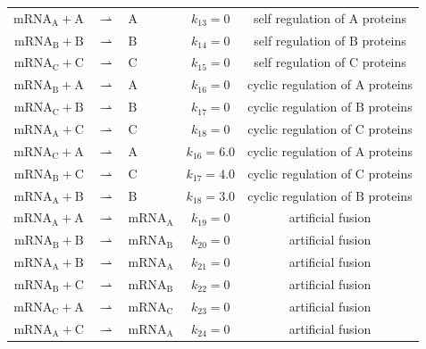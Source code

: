 \documentclass[oneside, abstracton, titlepage]{scrartcl}
\begin{document}
\begin{table}[h]
{\begin{tabular}{rclcc}
				$\mathrm{mRNA}_\mathrm{A} + \mathrm{A}$ &$\rightharpoonup$& $\mathrm{A}$ & $k_{13} = 0$ & self regulation of $\mathrm{A}$ proteins\\
				$\mathrm{mRNA}_\mathrm{B} + \mathrm{B}$ &$\rightharpoonup$& $\mathrm{B}$ & $k_{14} = 0$ & self regulation of $\mathrm{B}$ proteins\\
				$\mathrm{mRNA}_\mathrm{C} + \mathrm{C}$ &$\rightharpoonup$& $\mathrm{C}$ & $k_{15} = 0$ & self regulation of $\mathrm{C}$ proteins\\
				$\mathrm{mRNA}_\mathrm{B} + \mathrm{A}$ &$\rightharpoonup$& $\mathrm{A}$ & $k_{16} = 0$ & cyclic regulation of $\mathrm{A}$ proteins\\
				$\mathrm{mRNA}_\mathrm{C} + \mathrm{B}$ &$\rightharpoonup$& $\mathrm{B}$ & $k_{17} = 0$ & cyclic regulation of $\mathrm{B}$ proteins\\
				$\mathrm{mRNA}_\mathrm{A} + \mathrm{C}$ &$\rightharpoonup$& $\mathrm{C}$ & $k_{18} = 0$ & cyclic regulation of $\mathrm{C}$ proteins\\
				$\mathrm{mRNA}_\mathrm{C} + \mathrm{A}$ &$\rightharpoonup$& $\mathrm{A}$ & $k_{16} = 6.0$ & cyclic regulation of $\mathrm{A}$ proteins\\
				$\mathrm{mRNA}_\mathrm{B} + \mathrm{C}$ &$\rightharpoonup$& $\mathrm{C}$ & $k_{17} = 4.0$ & cyclic regulation of $\mathrm{C}$ proteins\\
				$\mathrm{mRNA}_\mathrm{A} + \mathrm{B}$ &$\rightharpoonup$& $\mathrm{B}$ & $k_{18} = 3.0$ & cyclic regulation of $\mathrm{B}$ proteins\\
				$\mathrm{mRNA}_\mathrm{A} + \mathrm{A}$ &$\rightharpoonup$& $\mathrm{mRNA}_\mathrm{A}$ & $k_{19} = 0$ & artificial fusion\\
				$\mathrm{mRNA}_\mathrm{B} + \mathrm{B}$ &$\rightharpoonup$& $\mathrm{mRNA}_\mathrm{B}$ & $k_{20} = 0$ & artificial fusion\\
				$\mathrm{mRNA}_\mathrm{A} + \mathrm{B}$ &$\rightharpoonup$& $\mathrm{mRNA}_\mathrm{A}$ & $k_{21} = 0$ & artificial fusion\\
				$\mathrm{mRNA}_\mathrm{B} + \mathrm{C}$ &$\rightharpoonup$& $\mathrm{mRNA}_\mathrm{B}$ & $k_{22} = 0$ & artificial fusion\\
				$\mathrm{mRNA}_\mathrm{C} + \mathrm{A}$ &$\rightharpoonup$& $\mathrm{mRNA}_\mathrm{C}$ & $k_{23} = 0$ & artificial fusion\\
				$\mathrm{mRNA}_\mathrm{A} + \mathrm{C}$ &$\rightharpoonup$& $\mathrm{mRNA}_\mathrm{A}$ & $k_{24} = 0$ & artificial fusion\\

\end{tabular}}
\end{table}
\end{document}
